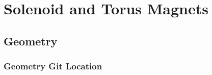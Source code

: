 \section{Solenoid and Torus Magnets}


\subsection{Geometry}

\subsubsection{Geometry Git Location}

